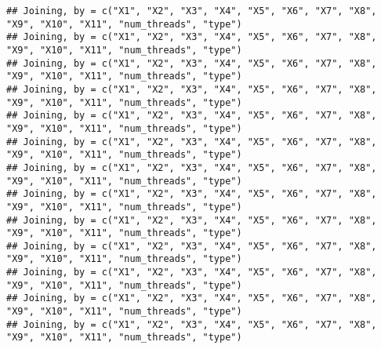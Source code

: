 \documentclass[]{article}
\newenvironment{Shaded}{\begin{snugshade}}{\end{snugshade}}
\newcommand{\KeywordTok}[1]{\textcolor[rgb]{0.13,0.29,0.53}{\textbf{#1}}}
\newcommand{\DecValTok}[1]{\textcolor[rgb]{0.00,0.00,0.81}{#1}}
\newcommand{\StringTok}[1]{\textcolor[rgb]{0.31,0.60,0.02}{#1}}
\newcommand{\OperatorTok}[1]{\textcolor[rgb]{0.81,0.36,0.00}{\textbf{#1}}}
\newcommand{\NormalTok}[1]{#1}
\begin{document}
\begin{Shaded}
\end{Shaded}

\begin{verbatim}
## Joining, by = c("X1", "X2", "X3", "X4", "X5", "X6", "X7", "X8", "X9", "X10", "X11", "num_threads", "type")
## Joining, by = c("X1", "X2", "X3", "X4", "X5", "X6", "X7", "X8", "X9", "X10", "X11", "num_threads", "type")
## Joining, by = c("X1", "X2", "X3", "X4", "X5", "X6", "X7", "X8", "X9", "X10", "X11", "num_threads", "type")
## Joining, by = c("X1", "X2", "X3", "X4", "X5", "X6", "X7", "X8", "X9", "X10", "X11", "num_threads", "type")
## Joining, by = c("X1", "X2", "X3", "X4", "X5", "X6", "X7", "X8", "X9", "X10", "X11", "num_threads", "type")
## Joining, by = c("X1", "X2", "X3", "X4", "X5", "X6", "X7", "X8", "X9", "X10", "X11", "num_threads", "type")
## Joining, by = c("X1", "X2", "X3", "X4", "X5", "X6", "X7", "X8", "X9", "X10", "X11", "num_threads", "type")
## Joining, by = c("X1", "X2", "X3", "X4", "X5", "X6", "X7", "X8", "X9", "X10", "X11", "num_threads", "type")
## Joining, by = c("X1", "X2", "X3", "X4", "X5", "X6", "X7", "X8", "X9", "X10", "X11", "num_threads", "type")
## Joining, by = c("X1", "X2", "X3", "X4", "X5", "X6", "X7", "X8", "X9", "X10", "X11", "num_threads", "type")
## Joining, by = c("X1", "X2", "X3", "X4", "X5", "X6", "X7", "X8", "X9", "X10", "X11", "num_threads", "type")
## Joining, by = c("X1", "X2", "X3", "X4", "X5", "X6", "X7", "X8", "X9", "X10", "X11", "num_threads", "type")
## Joining, by = c("X1", "X2", "X3", "X4", "X5", "X6", "X7", "X8", "X9", "X10", "X11", "num_threads", "type")
\end{verbatim}
\end{document}
